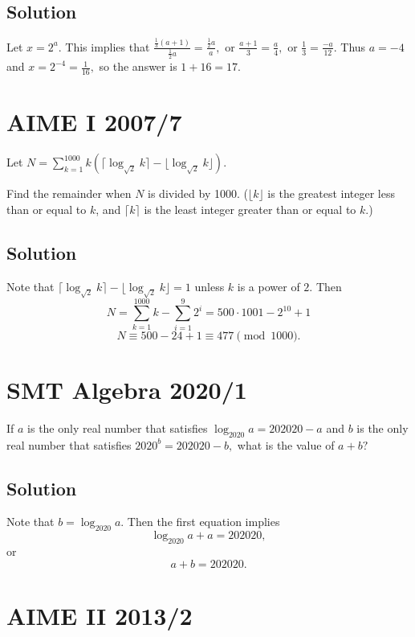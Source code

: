 \documentclass{article}
\begin{document}
\subsection{Solution}

Let $x=2^a.$ This implies that $\frac{\frac{1}{3}(a+1)}{\frac{1}{2}a}=\frac{\frac{1}{2}a}{a},$ or $\frac{a+1}{3}=\frac{a}{4},$ or $\frac{1}{3}=\frac{-a}{12}.$ Thus $a=-4$ and $x=2^{-4}=\frac{1}{16},$ so the answer is $1+16=17.$ 

\pagebreak\section{AIME I 2007/7}

Let $N = \sum\limits_{k = 1}^{1000} k ( \lceil \log_{\sqrt{2}} k \rceil  - \lfloor \log_{\sqrt{2}} k \rfloor ).$

Find the remainder when $N$ is divided by 1000. ($\lfloor{k}\rfloor$ is the greatest integer less than or equal to $k$, and $\lceil{k}\rceil$ is the least integer greater than or equal to $k$.)

\subsection{Solution}

Note that $\lceil\log_{\sqrt{2}}k\rceil-\lfloor\log_{\sqrt{2}}k\rfloor=1$ unless $k$ is a power of $2.$ Then
    \[N=\sum\limits_{k=1}^{1000}k-\sum\limits_{i=1}^{9}2^i=500\cdot 1001-2^{10}+1\]
    \[N\equiv 500-24+1\equiv 477\pmod{1000}.\]

\pagebreak\section{SMT Algebra 2020/1}

If $a$ is the only real number that satisfies $\log_{2020}a=202020-a$ and $b$ is the only real number that satisfies $2020^b=202020-b,$ what is the value of $a+b?$

\subsection{Solution}

Note that $b=\log_{2020}a.$ Then the first equation implies
    \[\log_{2020}a+a=202020,\] or
    \[a+b=202020.\]

\pagebreak\section{AIME II 2013/2}
\end{document}
